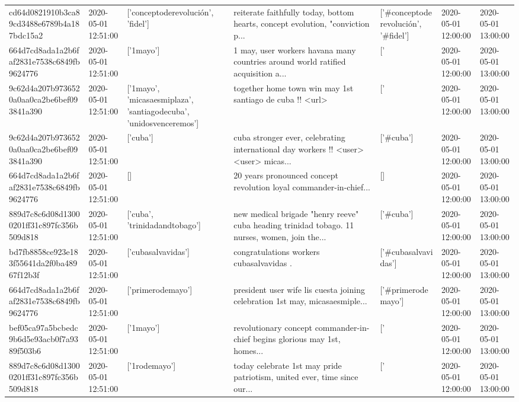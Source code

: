 \begin{tabular}{lllllll}
cd64d0821910b3ca89cd3488e6789b4a187bdc15a2 & 2020-05-01 12:51:00 & ['conceptoderevolución', 'fidel'] & reiterate faithfully today, bottom hearts, concept evolution, "conviction p... & ['#conceptoderevolución', '#fidel'] & 2020-05-01 12:00:00 & 2020-05-01 13:00:00 \\
664d7cd8ada1a2b6faf2831e7538c6849fb9624776 & 2020-05-01 12:51:00 & ['1mayo'] & 1 may, user workers havana many countries around world ratified acquisition a... & ['#1mayo'] & 2020-05-01 12:00:00 & 2020-05-01 13:00:00 \\
9c62d4a207b9736520a0aa0ca2be6bef093841a390 & 2020-05-01 12:51:00 & ['1mayo', 'micasaesmiplaza', 'santiagodecuba', 'unidosvenceremos'] & together home town win may 1st santiago de cuba !!️ <url> & ['#1mayo', '#micasaesmiplaza', '#unidosvenceremos'] & 2020-05-01 12:00:00 & 2020-05-01 13:00:00 \\
9c62d4a207b9736520a0aa0ca2be6bef093841a390 & 2020-05-01 12:51:00 & ['cuba'] & cuba stronger ever, celebrating international day workers !!️ <user> <user> micas... & ['#cuba'] & 2020-05-01 12:00:00 & 2020-05-01 13:00:00 \\
664d7cd8ada1a2b6faf2831e7538c6849fb9624776 & 2020-05-01 12:51:00 & [] & 20 years pronounced concept revolution loyal commander-in-chief... & [] & 2020-05-01 12:00:00 & 2020-05-01 13:00:00 \\
889d7c8c6d08d13000201ff31c897fc356b509d818 & 2020-05-01 12:51:00 & ['cuba', 'trinidadandtobago'] & new medical brigade "henry reeve" cuba heading trinidad tobago. 11 nurses, women, join the... & ['#cuba'] & 2020-05-01 12:00:00 & 2020-05-01 13:00:00 \\
bd7fb8858ce923e183f55641da2f0ba48967f12b3f & 2020-05-01 12:51:00 & ['cubasalvavidas'] & congratulations workers cubasalvavidas ️. & ['#cubasalvavidas'] & 2020-05-01 12:00:00 & 2020-05-01 13:00:00 \\
664d7cd8ada1a2b6faf2831e7538c6849fb9624776 & 2020-05-01 12:51:00 & ['primerodemayo'] & president user wife lis cuesta joining celebration 1st may, micasaesmiple... & ['#primerodemayo'] & 2020-05-01 12:00:00 & 2020-05-01 13:00:00 \\
bef05ca97a5bcbedc9b6d5e93acb0f7a9389f503b6 & 2020-05-01 12:51:00 & ['1mayo'] & revolutionary concept commander-in-chief begins glorious may 1st, homes... & ['#1mayo'] & 2020-05-01 12:00:00 & 2020-05-01 13:00:00 \\
889d7c8c6d08d13000201ff31c897fc356b509d818 & 2020-05-01 12:51:00 & ['1rodemayo'] & today celebrate 1st may pride patriotism, united ever, time since our... & ['#1rodemayo'] & 2020-05-01 12:00:00 & 2020-05-01 13:00:00 \\

\end{tabular}
